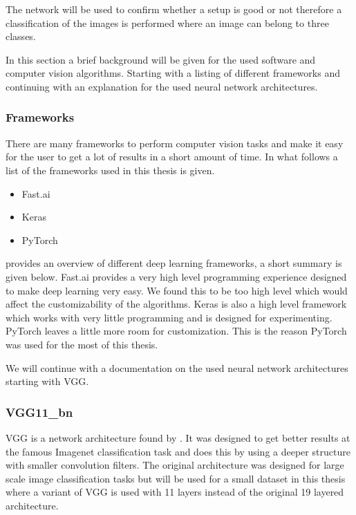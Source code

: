 		The network will be used to confirm whether a setup is good or not therefore a classification of the images is performed where an image can belong to three classes. 

	In this section a brief background will be given for the used software and computer vision algorithms. Starting with a listing of different frameworks and continuing with an explanation for the used neural network architectures.
	
	\subsubsection{Frameworks}
	
		There are many frameworks to perform computer vision tasks and make it easy for the user to get a lot of results in a short amount of time. In what follows a list of the frameworks used in this thesis is given.
		\begin{itemize}
		\item Fast.ai  \citep{fastai} 
		\item Keras \citep{keras} 
		\item PyTorch \citep{pytorch} 
		\end{itemize}
		
		\cite{basnet2019towards} provides an overview of different deep learning frameworks, a short summary is given below.
		Fast.ai provides a very high level programming experience designed to make deep learning very easy. We found this to be too high level which would affect the customizability of the algorithms.
		Keras is also a high level framework which works with very little programming and is designed for experimenting. 
		PyTorch leaves a little more room for customization. This is the reason PyTorch was used for the most of this thesis. 
		
		
		We will continue with a documentation on the used neural network architectures starting with VGG.
		
	
			\subsubsection{VGG11\_bn}
		VGG is a network architecture found by \cite{Simonyan2015}. It was designed to get better results at the famous Imagenet classification task and does this by using a deeper structure with smaller convolution filters. The original architecture was designed for large scale image classification tasks but will be used for a small dataset in this thesis where a variant of VGG is used with 11 layers instead of the original 19 layered architecture.
		
